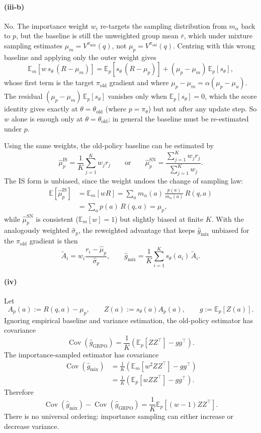 \documentclass[11pt]{article}
\newcommand{\E}{\mathbb{E}}
\newcommand{\Cov}{\operatorname{Cov}}
\begin{document}
\paragraph{(iii-b)}
No. The importance weight $w_i$ re-targets the sampling distribution from $m_\alpha$ back to $p$, but the baseline is still the unweighted group mean $\bar r$, which under mixture sampling estimates $\mu_m=V^{\pi_{\mathrm{mix}}}(q)$, not $\mu_p=V^{\pi_{\mathrm{old}}}(q)$. Centring with this wrong baseline and applying only the outer weight gives
\[
    \E_m\!\left[w\,s_\theta\,(R-\mu_m)\right]
    =
    \E_p\!\left[s_\theta\,(R-\mu_p)\right]
    +(\mu_p-\mu_m)\,\E_p[s_\theta],
\]
whose first term is the target $\pi_{\mathrm{old}}$ gradient and where $\mu_p-\mu_m=\alpha(\mu_p-\mu_u)$. The residual $(\mu_p-\mu_m)\,\E_p[s_\theta]$ vanishes only when $\E_p[s_\theta]=0$, which the score identity gives exactly at $\theta=\theta_{\mathrm{old}}$ (where $p=\pi_\theta$) but not after any update step. So $w$ alone is enough only at $\theta=\theta_{\mathrm{old}}$; in general the baseline must be re-estimated under $p$.

Using the same weights, the old-policy baseline can be estimated by
\[
    \widehat\mu_p^{\mathrm{IS}}=\frac1K\sum_{j=1}^K w_jr_j
    \qquad\text{or}\qquad
    \widehat\mu_p^{\mathrm{SN}}=\frac{\sum_{j=1}^K w_jr_j}{\sum_{j=1}^K w_j}.
\]
The IS form is unbiased, since the weight undoes the change of sampling law:
\[
\begin{aligned}
    \E\!\left[\widehat\mu_p^{\mathrm{IS}}\right]
    &=\E_m[wR]
    =\sum_a m_\alpha(a)\,\frac{p(a)}{m_\alpha(a)}\,R(q,a)\\
    &=\sum_a p(a)\,R(q,a)=\mu_p,
\end{aligned}
\]
while $\widehat\mu_p^{\mathrm{SN}}$ is consistent ($\E_m[w]=1$) but slightly biased at finite $K$. With the analogously weighted $\widehat\sigma_p$, the reweighted advantage that keeps $\widehat g_{\mathrm{mix}}$ unbiased for the $\pi_{\mathrm{old}}$ gradient is then
\[
    \widetilde A_i=w_i\frac{r_i-\widehat\mu_p}{\widehat\sigma_p},
    \qquad
    \widehat g_{\mathrm{mix}}=\frac1K\sum_{i=1}^K s_\theta(a_i)\,\widetilde A_i.
\]

\paragraph{(iv)}
Let
\[
    A_p(a):=R(q,a)-\mu_p,
    \qquad
    Z(a):=s_\theta(a)A_p(a),
    \qquad
    g:=\E_p[Z(a)].
\]
Ignoring empirical baseline and variance estimation, the old-policy estimator has covariance
\[
    \Cov(\widehat g_{\mathrm{GRPO}})
    =
    \frac1K\left(\E_p[ZZ^\top]-gg^\top\right).
\]
The importance-sampled estimator has covariance
\[
\begin{aligned}
    \Cov(\widehat g_{\mathrm{mix}})
    &=
    \frac1K\left(\E_m[w^2ZZ^\top]-gg^\top\right) \\
    &=
    \frac1K\left(\E_p[wZZ^\top]-gg^\top\right).
\end{aligned}
\]
Therefore
\[
    \Cov(\widehat g_{\mathrm{mix}})
    -
    \Cov(\widehat g_{\mathrm{GRPO}})
    =
    \frac1K\E_p[(w-1)ZZ^\top].
\]
There is no universal ordering: importance sampling can either increase or decrease variance.
\end{document}
